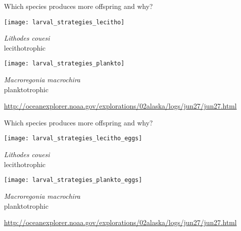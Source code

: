\documentclass[t]{beamer}
\begin{document}
\begin{frame}[t]{Which species produces more offspring and why?}
	\begin{multicols}{2}

	\begin{center}
		\texttt{[image: larval\_strategies\_lecitho]}
		
		\textit{Lithodes couesi}\\
		lecithotrophic

	\end{center}	
	\columnbreak

	\begin{center}	
		\texttt{[image: larval\_strategies\_plankto]}

		\textit{Macroregonia macrochira}\\
		planktotrophic
	\end{center}
	\end{multicols}
	
	\vspace*{-\baselineskip}
	
	
	\vfilll
	
	\hfill \tiny \url{http://oceanexplorer.noaa.gov/explorations/02alaska/logs/jun27/jun27.html}
\end{frame}
%
\begin{frame}[t]{Which species produces more offspring and why?}
	\begin{multicols}{2}

	\begin{center}
		\texttt{[image: larval\_strategies\_lecitho\_eggs]}
		
		\textit{Lithodes couesi}\\
		lecithotrophic

	\end{center}	
	\columnbreak

	\begin{center}	
		\texttt{[image: larval\_strategies\_plankto\_eggs]}

		\textit{Macroregonia macrochira}\\
		planktotrophic
	\end{center}
	\end{multicols}
	
	
	\vfilll
	
	\hfill \tiny \url{http://oceanexplorer.noaa.gov/explorations/02alaska/logs/jun27/jun27.html}
\end{frame}
\end{document}
